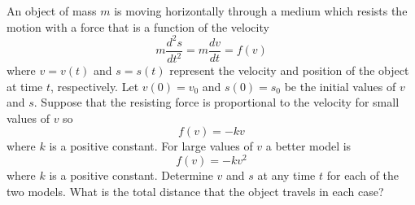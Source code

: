 \begin{problem}
    An object of mass \(m\) is moving horizontally through a medium which resists the
    motion with a force that is a function of the velocity
    \[m\frac{d^2s}{dt^2}=m\frac{dv}{dt}=f(v)\]
    where \(v=v(t)\) and \(s=s(t)\) represent the velocity and position of the
    object at time \(t\), respectively.
    Let \(v(0)=v_0\) and \(s(0)=s_0\) be the initial values of \(v\) and \(s\).
    Suppose that the resisting force is proportional to the velocity for small
    values of \(v\) so
    \[f(v)=-kv\]
    where \(k\) is a positive constant.
    For large values of \(v\) a better model is
    \[f(v)=-kv^2\]
    where \(k\) is a positive constant.
    Determine \(v\) and \(s\) at any time \(t\) for each of the two models.
    What is the total distance that the object travels in each case?
\end{problem}
